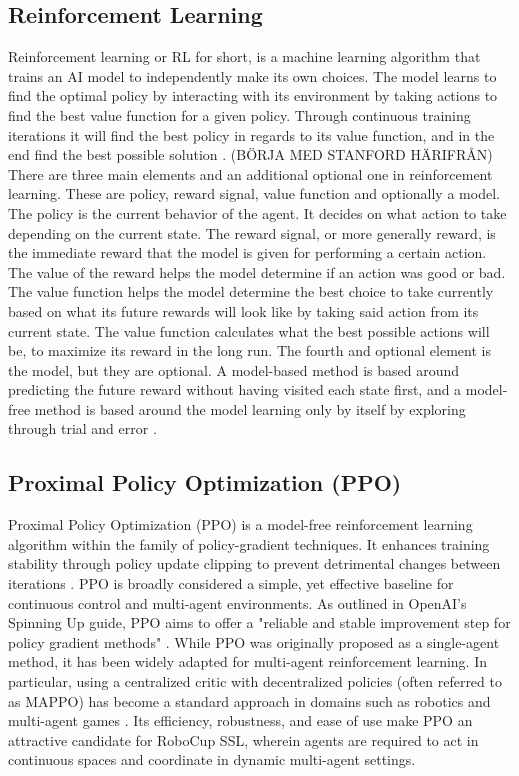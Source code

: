 \subsection{Reinforcement Learning}
Reinforcement learning or RL for short, is a machine learning algorithm that trains an AI model to independently make its own choices. The model learns to find the optimal policy by interacting with its environment by taking actions to find the best value function for a given policy. Through continuous training iterations it will find the best policy in regards to its value function, and in the end find the best possible solution \cite{ieeeRL1}. (BÖRJA MED STANFORD HÄRIFRÅN)
There are three main elements and an additional optional one in reinforcement learning. These are policy, reward signal, value function and optionally a model. The policy is the current behavior of the agent. It decides on what action to take depending on the current state. The reward signal, or more generally reward, is the immediate reward that the model is given for performing a certain action. The value of the reward helps the model determine if an action was good or bad. The value function helps the model determine the best choice to take currently based on what its future rewards will look like by taking said action from its current state. The value function calculates what the best possible actions will be, to maximize its reward in the long run. The fourth and optional element is the model, but they are optional. A model-based method is based around predicting the future reward without having visited each state first, and a model-free method is based around the model learning only by itself by exploring through trial and error \cite{SuttonBartoRL2}.

\subsection{Proximal Policy Optimization (PPO)}
Proximal Policy Optimization (PPO) is a model-free reinforcement learning algorithm within the family of policy-gradient techniques. 
It enhances training stability through policy update clipping to prevent detrimental changes between iterations \cite{Schulman2017PPO}. 
PPO is broadly considered a simple, yet effective baseline for continuous control and multi-agent environments. 
As outlined in OpenAI's Spinning Up guide, PPO aims to offer a "reliable and stable improvement step for policy gradient methods" \cite{OpenAISpinningUp}. 
While PPO was originally proposed as a single-agent method, it has been widely adapted for multi-agent reinforcement learning. 
In particular, using a centralized critic with decentralized policies (often referred to as MAPPO) has become a standard approach in domains such as robotics and multi-agent games \cite{Yu2021MAPPO}. 
Its efficiency, robustness, and ease of use make PPO an attractive candidate for RoboCup SSL, wherein agents are required to act in continuous spaces and coordinate in dynamic multi-agent settings.

